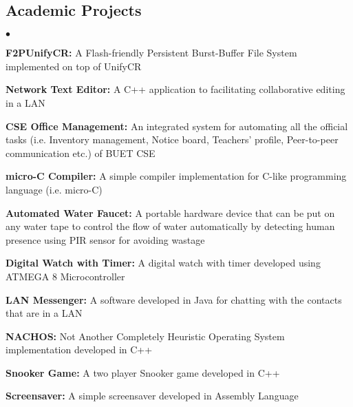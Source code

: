 \documentclass[margin,line]{res}
\newenvironment{list2}{
  \begin{list}{$\bullet$}{%
      \setlength{\itemsep}{0in}
      \setlength{\parsep}{0in} \setlength{\parskip}{0in}
      \setlength{\topsep}{0in} \setlength{\partopsep}{0in} 
      \setlength{\leftmargin}{0.2in}}}{\end{list}}
\begin{document}
\begin{resume}
\section{\sc Academic Projects}
\begin{list2}
\item {\bf F2PUnifyCR:} A Flash-friendly Persistent Burst-Buffer File System implemented on top of UnifyCR
\item {\bf Network Text Editor:} A C++ application to facilitating collaborative editing in a LAN
\item {\bf CSE Office Management:} An integrated system for automating all the official tasks (i.e. Inventory management, Notice board, Teachers' profile, Peer-to-peer communication etc.) of BUET CSE
\item {\bf micro-C Compiler:} A simple compiler implementation for C-like programming language (i.e. micro-C)
\item {\bf Automated Water Faucet:} A portable hardware device that can be put on any water tape to control the flow of water automatically by detecting human presence using PIR sensor for avoiding wastage
\item {\bf Digital Watch with Timer:} A digital watch with timer developed using ATMEGA 8 Microcontroller
\item {\bf LAN Messenger:} A software developed in Java for chatting with the contacts that are in a LAN
\item {\bf NACHOS:} Not Another Completely Heuristic Operating System implementation developed in C++
\item {\bf Snooker Game:} A two player Snooker game developed in C++
\item {\bf Screensaver:} A simple screensaver developed in Assembly Language
\end{list2}

\vspace*{-.1in}


\end{resume}
\end{document}
